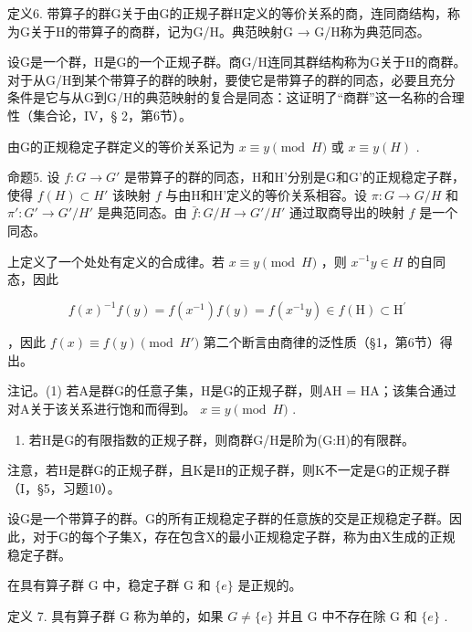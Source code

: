 定义6. 带算子的群G关于由G的正规子群H定义的等价关系的商，连同商结构，称为G关于H的带算子的商群，记为G/H。典范映射G → G/H称为典范同态。

设G是一个群，H是G的一个正规子群。商G/H连同其群结构称为G关于H的商群。对于从G/H到某个带算子的群的映射，要使它是带算子的群的同态，必要且充分条件是它与从G到G/H的典范映射的复合是同态：这证明了“商群”这一名称的合理性（集合论，IV，§ 2，第6节）。

由G的正规稳定子群定义的等价关系记为 \(x \equiv y \pmod{H}\) 或 \(x \equiv y(H)\) .

命题5. 设 \(f: G \to G'\) 是带算子的群的同态，H和H'分别是G和G'的正规稳定子群，使得 \(f(H) \subset H'\) 该映射 \(f\) 与由H和H'定义的等价关系相容。设 \(\pi: G \to G/H\) 和 \(\pi': G' \to G'/H'\) 是典范同态。由 \(\bar{f}: G/H \to G'/H'\) 通过取商导出的映射 \(f\) 是一个同态。

上定义了一个处处有定义的合成律。若 \(x \equiv y \pmod{H}\) ，则 \(x^{-1}y \in H\) 的自同态，因此

\[
f (x) ^ {- 1} f (y) = f \left(x ^ {- 1}\right) f (y) = f \left(x ^ {- 1} y\right) \in f (\mathrm{H}) \subset \mathrm{H} ^ {\prime}
\]

，因此 \(f(x) \equiv f(y) \pmod{H'}\) 第二个断言由商律的泛性质（§1，第6节）得出。

注记。(1) 若A是群G的任意子集，H是G的正规子群，则AH = HA；该集合通过对A关于该关系进行饱和而得到。 \(x \equiv y \pmod{H}\) .

\begin{enumerate}
\def\labelenumi{(\arabic{enumi})}
\setcounter{enumi}{1}
\tightlist
\item
  若H是G的有限指数的正规子群，则商群G/H是阶为(G:H)的有限群。
\end{enumerate}

注意，若H是群G的正规子群，且K是H的正规子群，则K不一定是G的正规子群（I，§5，习题10）。

设G是一个带算子的群。G的所有正规稳定子群的任意族的交是正规稳定子群。因此，对于G的每个子集X，存在包含X的最小正规稳定子群，称为由X生成的正规稳定子群。

在具有算子群 G 中，稳定子群 G 和 \(\{e\}\) 是正规的。

定义 7. 具有算子群 G 称为单的，如果 \(G \neq \{e\}\) 并且 G 中不存在除 G 和 \(\{e\}\) .

